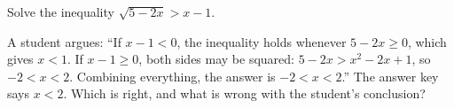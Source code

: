 Solve the inequality $\sqrt{5-2x}>x-1$.

A student argues: ``If $x-1<0$, the inequality holds whenever $5-2x\ge0$, which gives $x<1$. If $x-1\ge0$, both sides may be squared: $5-2x>x^2-2x+1$, so $-2<x<2$. Combining everything, the answer is $-2<x<2$.'' The answer key says $x<2$. Which is right, and what is wrong with the student's conclusion?
